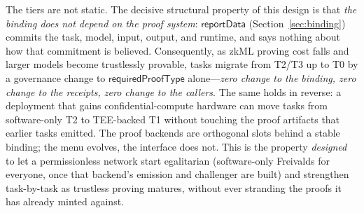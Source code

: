 The tiers are not static. The decisive structural property of this design is that
\emph{the binding does not depend on the proof system}: $\mathsf{reportData}$
(Section~\ref{sec:binding}) commits the task, model, input, output, and runtime, and
says nothing about how that commitment is believed. Consequently, as zkML proving cost
falls and larger models become trustlessly provable, tasks migrate from T2/T3 up to
T0 by a governance change to $\mathsf{requiredProofType}$ alone---\emph{zero change to
the binding, zero change to the receipts, zero change to the callers}. The same holds
in reverse: a deployment that gains confidential-compute hardware can move tasks from
software-only T2 to TEE-backed T1 without touching the proof artifacts that earlier
tasks emitted. The proof backends are orthogonal slots behind a stable binding; the
menu evolves, the interface does not. This is the property \emph{designed} to let a
permissionless network start egalitarian (software-only Freivalds for everyone, once
that backend's emission and challenger are built) and strengthen
task-by-task as trustless proving matures, without ever stranding the proofs it has
already minted against.
